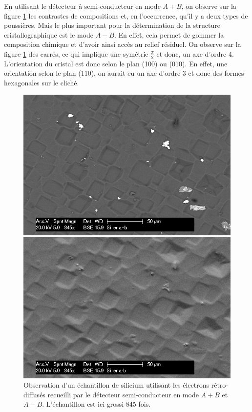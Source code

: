 \documentclass[a4paper,12pt]{article}
\begin{document}
En utilisant le détecteur à semi-conducteur en mode $A+B$, on observe sur la figure \ref{fig:si_er_apb_amb} les contrastes de compositions et, en l'occurrence, qu'il y a deux types de poussières. Mais le plus important pour la détermination de la structure cristallographique est le mode $A-B$. En effet, cela permet de gommer la composition chimique et d'avoir ainsi accès au relief résiduel. On observe sur la figure \ref{fig:si_er_apb_amb} des carrés, ce qui implique une symétrie $\frac{\pi}{2}$ et donc, un axe d'ordre 4. L'orientation du cristal est donc selon le plan (100) ou (010). En effet, une orientation selon le plan (110), on aurait eu un axe d'ordre 3 et donc des formes hexagonales sur le cliché.
\begin{figure}
\begin{minipage}[c]{.55\linewidth}
\centering
\includegraphics[width=1\textwidth]{images/si_er_apb.png}
 \end{minipage}\hfill
\begin{minipage}[c]{.55\linewidth}
\centering
\includegraphics[width=1\textwidth]{images/si_er_amb.png}
\end{minipage}
\caption{Observation d'un échantillon de silicium utilisant les électrons rétro-diffusés recueilli par le détecteur semi-conducteur en mode $A+B$ et $A-B$. L'échantillon est ici grossi 845 fois.}
\label{fig:si_er_apb_amb}
\end{figure}
\end{document}
